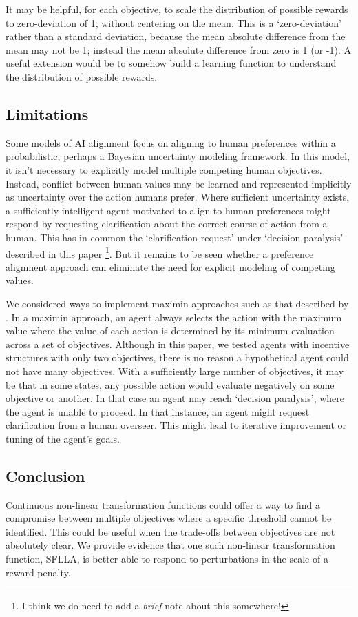 It may be helpful, for each objective, to scale the distribution of possible rewards to zero-deviation of 1, without centering on the mean. This is a `zero-deviation' rather than a standard deviation, because the mean absolute difference from the mean may not be 1; instead the mean absolute difference from zero is 1 (or -1). A useful extension would be to somehow build a learning function to understand the distribution of possible rewards.




\subsection{Limitations}

Some models of AI alignment focus on \cite{russell2019human} aligning to human preferences within a probabilistic, perhaps a Bayesian uncertainty modeling framework.  In this model, it isn't necessary to explicitly model multiple competing human objectives. Instead, conflict between human values may be learned and represented implicitly as uncertainty over the action humans prefer. Where sufficient uncertainty exists, a sufficiently intelligent agent motivated to align to human preferences might respond by requesting clarification about the correct course of action from a human. This has in common the `clarification request' under `decision paralysis' described in this paper \footnote{I think we do need to add a \textit{brief} note about this somewhere!}. But it remains to be seen whether a preference alignment approach can eliminate the need for explicit modeling of competing values.

We considered ways to implement maximin approaches such as that described by \cite{vamplew_human-aligned_2018}. In a maximin approach, an agent always selects the action with the maximum value where the value of each action is determined by its minimum evaluation across a set of objectives. Although in this paper, we tested agents with incentive structures with only two objectives, there is no reason a hypothetical agent could not have many objectives. With a sufficiently large number of objectives, it may be that in some states, any possible action would evaluate negatively on some objective or another. In that case an agent may reach `decision paralysis', where the agent is unable to proceed. In that instance, an agent might request clarification from a human overseer. This might lead to iterative improvement or tuning of the agent's goals.

\subsection{Conclusion}

Continuous non-linear transformation functions could offer a way to find a compromise between multiple objectives where a specific threshold cannot be identified. This could be useful when the trade-offs between objectives are not absolutely clear. We provide evidence that one such non-linear transformation function, SFLLA, is better able to respond to perturbations in the scale of a reward penalty.
